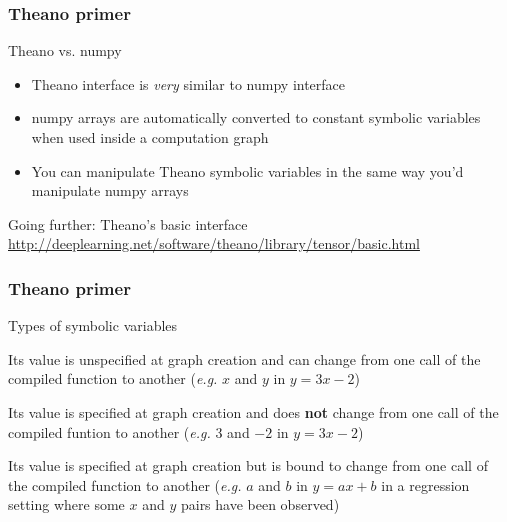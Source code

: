 \documentclass[mathserif, xcolor=dvipsnames]{beamer}
\begin{document}
\begin{frame}
    \frametitle{Theano primer}
    \begin{block}{Theano vs. numpy}
    \begin{itemize}\addtolength{\itemsep}{1.0\baselineskip}
        \item{Theano interface is \emph{very} similar to numpy interface}
        \item{numpy arrays are automatically converted to constant symbolic
              variables when used inside a computation graph}
        \item{You can manipulate Theano symbolic variables in the same way you'd
              manipulate numpy arrays}
    \end{itemize}
    \end{block}


    \begin{alertblock}{Going further: Theano's basic interface}
        \url{http://deeplearning.net/software/theano/library/tensor/basic.html}
    \end{alertblock}
\end{frame}

\begin{frame}
    \frametitle{Theano primer}
    \begin{block}{Types of symbolic variables}
    \begin{description}\addtolength{\itemsep}{1.0\baselineskip}
        \item[TensorVariable]{Its value is unspecified at graph creation and
                              can change from one call of the compiled function
                              to another (\emph{e.g.} $x$ and $y$ in
                              $y = 3x - 2$)}
        \item[TensorConstant]{Its value is specified at graph creation and
                              does \textbf{not} change from one call of the
                              compiled funtion to another (\emph{e.g.} $3$ and
                              $-2$ in $y = 3x - 2$)}
        \item[TensorSharedVariable]{Its value is specified at graph creation
                                    but is bound to change from one call of the
                                    compiled function to another (\emph{e.g.}
                                    $a$ and $b$ in $y = ax + b$ in a regression
                                    setting where some $x$ and $y$ pairs have
                                    been observed)}
    \end{description}
    \end{block}
\end{frame}
\end{document}

